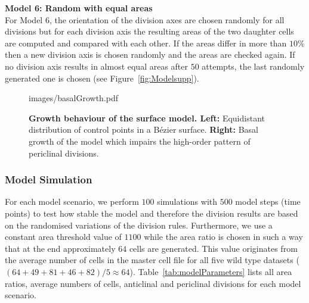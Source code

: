 \documentclass[11pt,a4paper, final]{article}
\begin{document}
\noindent
\textbf{Model 6: Random with equal areas}\\
\noindent
For Model 6, the orientation of the division axes are chosen randomly for all divisions but for each division axis the resulting areas of the two daughter cells are computed and compared with each other. If the areas differ in more than $10\%$ then a new division axis is chosen randomly and the areas are checked again. If no division axis results in almost equal areas after $50$ attempts, the last randomly generated one is chosen (see Figure~\ref{fig:Modelsupp}).

%
\begin{figure}[htbp]
	\begin{center}
		\begin{overpic}[width=1.\linewidth]{images/basalGrowth.pdf}
		\end{overpic}
\caption[]
{
{\bf Growth behaviour of the surface model. Left:} Equidistant distribution of control points in a B\'ezier surface. \textbf{Right:} Basal growth of the model which impairs the high-order pattern of periclinal divisions.
}
	\label{fig:basalGrowth}
	\end{center}
\end{figure}
%

\subsubsection{Model Simulation}
\noindent
For each model scenario, we perform $100$ simulations with $500$ model steps (time points) to test how stable the model and therefore the division results are based on the randomised variations of the division rules. Furthermore, we use a constant area threshold value of $1100$ while the area ratio is chosen in such a way that at the end approximately $64$ cells are generated. This value originates from the average number of cells in the master cell file for all five wild type datasets ($(64+49+81+46+82)/5 \approx 64$). Table~\ref{tab:modelParameters} lists all area ratios, average numbers of cells, anticlinal and periclinal divisions for each model scenario.
\end{document}
